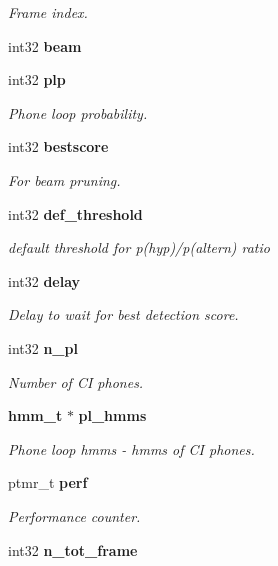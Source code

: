 \begin{DoxyCompactItemize}
\begin{DoxyCompactList}\small\item\em Frame index. \end{DoxyCompactList}\item 
int32 {\bfseries beam}\label{structkws__search__s_a5a84597099359059301dc6124579732e}

\item 
int32 {\bf plp}\label{structkws__search__s_a3bfc1d19e39d1cd321ce47280f1abe00}

\begin{DoxyCompactList}\small\item\em Phone loop probability. \end{DoxyCompactList}\item 
int32 {\bf bestscore}\label{structkws__search__s_a0a04bba471516468d1b2bea14632f255}

\begin{DoxyCompactList}\small\item\em For beam pruning. \end{DoxyCompactList}\item 
int32 {\bf def\-\_\-threshold}\label{structkws__search__s_afce4456a796dbc72149d7a47159ccca9}

\begin{DoxyCompactList}\small\item\em default threshold for p(hyp)/p(altern) ratio \end{DoxyCompactList}\item 
int32 {\bf delay}\label{structkws__search__s_acf2597fd017db4c2f90a9ba54e08a20c}

\begin{DoxyCompactList}\small\item\em Delay to wait for best detection score. \end{DoxyCompactList}\item 
int32 {\bf n\-\_\-pl}\label{structkws__search__s_aab6e42d0c93af992c16e2a75db386df4}

\begin{DoxyCompactList}\small\item\em Number of C\-I phones. \end{DoxyCompactList}\item 
{\bf hmm\-\_\-t} $\ast$ {\bf pl\-\_\-hmms}\label{structkws__search__s_a7b501f4cc5f4efb7b4ca0259afcf4e05}

\begin{DoxyCompactList}\small\item\em Phone loop hmms -\/ hmms of C\-I phones. \end{DoxyCompactList}\item 
ptmr\-\_\-t {\bf perf}\label{structkws__search__s_a0cc9f5fcc60e181adfef86acf781076d}

\begin{DoxyCompactList}\small\item\em Performance counter. \end{DoxyCompactList}\item 
int32 {\bfseries n\-\_\-tot\-\_\-frame}\label{structkws__search__s_a3beeae471b3e24f61295844302fd0cbb}

\end{DoxyCompactItemize}


